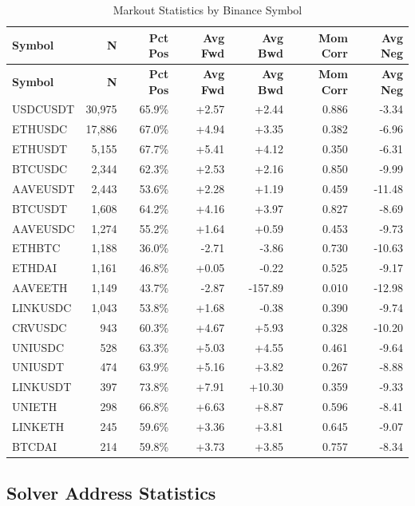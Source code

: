 \documentclass[12pt,a4paper]{article}
\begin{document}
\begin{longtable}{lrrrrrr}
\caption{Markout Statistics by Binance Symbol} \\
\toprule
\textbf{Symbol} & \textbf{N} & \textbf{Pct Pos} & \textbf{Avg Fwd} & \textbf{Avg Bwd} & \textbf{Mom Corr} & \textbf{Avg Neg} \\
\midrule
\endfirsthead
\toprule
\textbf{Symbol} & \textbf{N} & \textbf{Pct Pos} & \textbf{Avg Fwd} & \textbf{Avg Bwd} & \textbf{Mom Corr} & \textbf{Avg Neg} \\
\midrule
\endhead
USDCUSDT & 30,975 & 65.9\% & +2.57 & +2.44 & 0.886 & -3.34 \\
ETHUSDC & 17,886 & 67.0\% & +4.94 & +3.35 & 0.382 & -6.96 \\
ETHUSDT & 5,155 & 67.7\% & +5.41 & +4.12 & 0.350 & -6.31 \\
BTCUSDC & 2,344 & 62.3\% & +2.53 & +2.16 & 0.850 & -9.99 \\
AAVEUSDT & 2,443 & 53.6\% & +2.28 & +1.19 & 0.459 & -11.48 \\
BTCUSDT & 1,608 & 64.2\% & +4.16 & +3.97 & 0.827 & -8.69 \\
AAVEUSDC & 1,274 & 55.2\% & +1.64 & +0.59 & 0.453 & -9.73 \\
ETHBTC & 1,188 & 36.0\% & -2.71 & -3.86 & 0.730 & -10.63 \\
ETHDAI & 1,161 & 46.8\% & +0.05 & -0.22 & 0.525 & -9.17 \\
AAVEETH & 1,149 & 43.7\% & -2.87 & -157.89 & 0.010 & -12.98 \\
LINKUSDC & 1,043 & 53.8\% & +1.68 & -0.38 & 0.390 & -9.74 \\
CRVUSDC & 943 & 60.3\% & +4.67 & +5.93 & 0.328 & -10.20 \\
UNIUSDC & 528 & 63.3\% & +5.03 & +4.55 & 0.461 & -9.64 \\
UNIUSDT & 474 & 63.9\% & +5.16 & +3.82 & 0.267 & -8.88 \\
LINKUSDT & 397 & 73.8\% & +7.91 & +10.30 & 0.359 & -9.33 \\
UNIETH & 298 & 66.8\% & +6.63 & +8.87 & 0.596 & -8.41 \\
LINKETH & 245 & 59.6\% & +3.36 & +3.81 & 0.645 & -9.07 \\
BTCDAI & 214 & 59.8\% & +3.73 & +3.85 & 0.757 & -8.34 \\
\bottomrule
\end{longtable}

\subsection{Solver Address Statistics}
\end{document}
